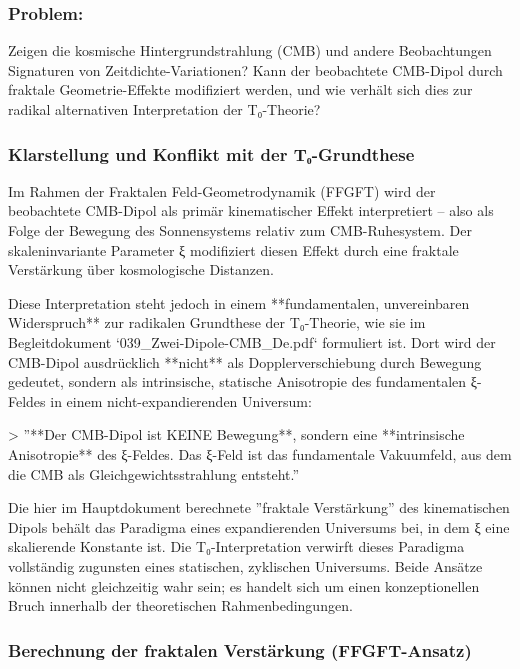 	\subsubsection*{Problem:}
	Zeigen die kosmische Hintergrundstrahlung (CMB) und andere Beobachtungen Signaturen von Zeitdichte-Variationen? Kann der beobachtete CMB-Dipol durch fraktale Geometrie-Effekte modifiziert werden, und wie verhält sich dies zur radikal alternativen Interpretation der T₀-Theorie?
	
	\subsubsection*{Klarstellung und Konflikt mit der T₀-Grundthese}
	
	Im Rahmen der Fraktalen Feld-Geometrodynamik (FFGFT) wird der beobachtete CMB-Dipol als primär kinematischer Effekt interpretiert – also als Folge der Bewegung des Sonnensystems relativ zum CMB-Ruhesystem. Der skaleninvariante Parameter ξ modifiziert diesen Effekt durch eine fraktale Verstärkung über kosmologische Distanzen.
	
	Diese Interpretation steht jedoch in einem **fundamentalen, unvereinbaren Widerspruch** zur radikalen Grundthese der T₀-Theorie, wie sie im Begleitdokument `039\_Zwei-Dipole-CMB\_De.pdf` formuliert ist. Dort wird der CMB-Dipol ausdrücklich **nicht** als Dopplerverschiebung durch Bewegung gedeutet, sondern als intrinsische, statische Anisotropie des fundamentalen ξ-Feldes in einem nicht-expandierenden Universum:
	
	> ''**Der CMB-Dipol ist KEINE Bewegung**, sondern eine **intrinsische Anisotropie** des ξ-Feldes. Das ξ-Feld ist das fundamentale Vakuumfeld, aus dem die CMB als Gleichgewichtsstrahlung entsteht.''
	
	Die hier im Hauptdokument berechnete ''fraktale Verstärkung'' des kinematischen Dipols behält das Paradigma eines expandierenden Universums bei, in dem ξ eine skalierende Konstante ist. Die T₀-Interpretation verwirft dieses Paradigma vollständig zugunsten eines statischen, zyklischen Universums. Beide Ansätze können nicht gleichzeitig wahr sein; es handelt sich um einen konzeptionellen Bruch innerhalb der theoretischen Rahmenbedingungen.
	
	\subsubsection*{Berechnung der fraktalen Verstärkung (FFGFT-Ansatz)}
	
